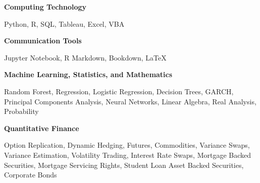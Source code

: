 \documentclass[11pt,a4paper,]{awesome-cv}
\begin{document}
\textbf{Computing Technology}

\vspace{-1ex}

Python, R, SQL, Tableau, Excel, VBA

\textbf{Communication Tools}

\vspace{-1ex}

Jupyter Notebook, R Markdown, Bookdown, \LaTeX

\textbf{Machine Learning, Statistics, and Mathematics}

\vspace{-1ex}

Random Forest, Regression, Logistic Regression, Decision Trees, GARCH,
Principal Components Analysis, Neural Networks, Linear Algebra, Real
Analysis, Probability

\textbf{Quantitative Finance}

\vspace{-1ex}

Option Replication, Dynamic Hedging, Futures, Commodities, Variance
Swaps, Variance Estimation, Volatility Trading, Interest Rate Swaps,
Mortgage Backed Securities, Mortgage Servicing Rights, Student Loan
Asset Backed Securities, Corporate Bonds
\end{document}
